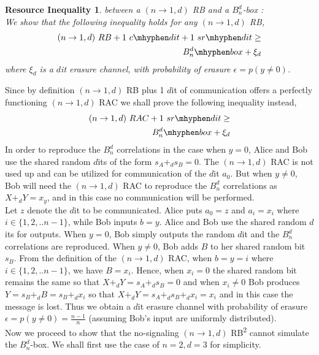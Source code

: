 \documentclass[%
 reprint,
 amsmath,amssymb,
 aps,
]{revtex4-1}
\newtheorem{mydef3}{Resource Inequality}
\begin{document}
\begin{mydef3}\label{re2}
between a $(n\rightarrow1,d)$ RB and a $B_n^d$-box : \\
We show that the following inequality holds for any $(n\rightarrow1,d)$ RB,
\begin{eqnarray} 
(n\rightarrow1,d)\ RB  +1\ c\mhyphen dit + 1\  sr\mhyphen dit \geq \nonumber \\ B_n^d\mhyphen box + \xi_d
\end{eqnarray}
where $\xi_d$ is a $d$it erasure channel, with probability of erasure $\epsilon=p(y\neq 0)$. 
\end{mydef3}
Since by definition $(n\rightarrow1,d)$ RB plus 1 $d$it of communication offers a perfectly functioning $(n\rightarrow1,d)$ RAC we shall prove the following inequality instead,
\begin{eqnarray}
(n\rightarrow1,d)\ RAC + 1\  sr\mhyphen dit \geq \nonumber \\ B_n^d\mhyphen box + \xi_d
\end{eqnarray}
In order to reproduce the $B_n^d$ correlations in the case when $y=0$, Alice and Bob use the shared random $d$its of the form $s_A +_d s_B =0$. The $(n\rightarrow1,d)$ RAC is not used up and can be utilized for communication of the $d$it $a_0$. But when $y\neq 0$, Bob will need the $(n\rightarrow1,d)$ RAC to reproduce the $B_n^d$ correlations as $X+_d Y=x_y$, and in this case no communication will be performed. \\
Let $z$ denote the $d$it to be communicated. Alice puts $a_0=z$ and  $a_i=x_i$ where $i\in \{1,2,..n-1\}$, while Bob inputs $b=y$. Alice and Bob use the shared random $d$its for outputs. When $y=0$, Bob simply outputs the random $d$it and the $B_n^d$ correlations are reproduced. When $y\neq 0$, Bob adds $B$ to her shared random bit $s_B$. From the definition of the $(n\rightarrow 1,d)$ RAC, when $b=y=i$ where $i\in \{1,2,..n-1\}$, we have $B=x_i$. Hence, when $x_i=0$ the shared random bit remains the same so that $X+_d Y=s_A+_d s_B=0$ and when $x_i\neq 0$ Bob produces $Y=s_B+_d B=s_B+_d x_i$ so that $X+_d Y=s_A+_ds_B+_d x_i=x_i$ and in this case the message is lost. Thus we obtain a $d$it erasure channel with probability of erasure  $\epsilon=p(y\neq 0)=\frac{n-1}{n}$ (assuming Bob's input are uniformly distributed). \\
Now we proceed to show that the no-signaling $(n\rightarrow1,d)$ RB\textsuperscript{2} cannot simulate the $B^d_n$-box. We shall first use the case of $n=2,d=3$ for simplicity.\\
\end{document}
